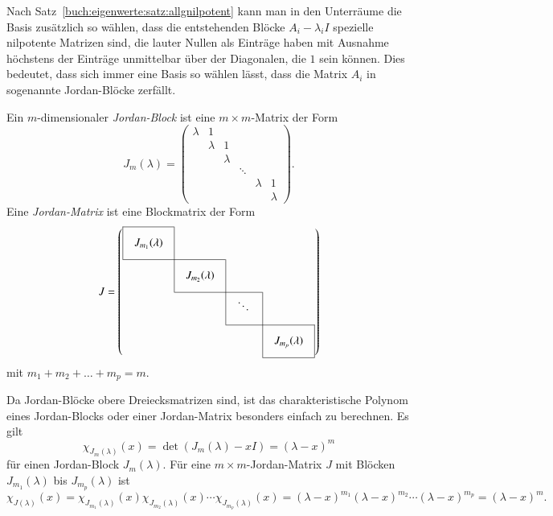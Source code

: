 Nach Satz~\ref{buch:eigenwerte:satz:allgnilpotent}
kann man in den Unterräume die Basis zusätzlich so wählen, dass 
die entstehenden Blöcke $A_i-\lambda_i I$ spezielle nilpotente Matrizen sind,
die lauter Nullen als Einträge haben mit Ausnahme 
höchstens der Einträge unmittelbar über der Diagonalen, die $1$ sein können.
Dies bedeutet, dass sich immer eine Basis so wählen lässt, dass die
Matrix $A_i$ in sogenannte Jordan-Blöcke zerfällt.

\begin{definition}
Ein $m$-dimensionaler {\em Jordan-Block} ist eine $m\times m$-Matrix
%
der Form
\[
J_m(\lambda)
=
\begin{pmatrix}
\lambda &    1    &         &        &         &         \\
        & \lambda &    1    &        &         &         \\
        &         & \lambda &        &         &         \\
        &         &         & \ddots &         &         \\
        &         &         &        & \lambda &     1   \\
        &         &         &        &         & \lambda 
\end{pmatrix}.
\]
Eine {\em Jordan-Matrix} ist eine Blockmatrix der Form
\[
J
=
\def\temp#1{\multicolumn{1}{|c}{\raisebox{0pt}[17pt][12pt]{\phantom{x}$#1\mathstrut$}\phantom{x}}}
\left(
\begin{array}{cccc}
\cline{1-1}
\temp{J_{m_1}(\lambda)} &\multicolumn{1}{|c}{}&        &           \\
\cline{1-2}
          &\temp{J_{m_2}(\lambda)}&\multicolumn{1}{|c}{}&           \\
\cline{2-3}
          &           &\temp{\ddots}&\multicolumn{1}{|c}{}\\
\cline{3-4}
          &           &        &\multicolumn{1}{|c|}{\raisebox{0pt}[17pt][12pt]{\phantom{x}$J_{m_p}(\lambda)$}\phantom{x}}\\
\cline{4-4}
\end{array}
\right)
\]
mit $m_1+m_2+\dots+m_p=m$.
%
\end{definition}

Da Jordan-Blöcke obere Dreiecksmatrizen sind, ist
das charakteristische Polynom eines Jordan-Blocks oder einer Jordan-Matrix
besonders einfach zu berechnen.
Es gilt
\[
\chi_{J_m(\lambda)}(x)
=
\det (J_m(\lambda) - xI)
=
(\lambda-x)^m
\]
für einen Jordan-Block $J_m(\lambda)$.
Für eine $m\times m$-Jordan-Matrix $J$ mit Blöcken $J_{m_1}(\lambda)$
bis $J_{m_p}(\lambda)$ ist
\[
\chi_{J(\lambda)}(x)
=
\chi_{J_{m_1}(\lambda)}(x)
\chi_{J_{m_2}(\lambda)}(x)
\cdots
\chi_{J_{m_p}(\lambda)}(x)
=
(\lambda-x)^{m_1}
(\lambda-x)^{m_2}
\cdots
(\lambda-x)^{m_p}
=
(\lambda-x)^m.
\]

